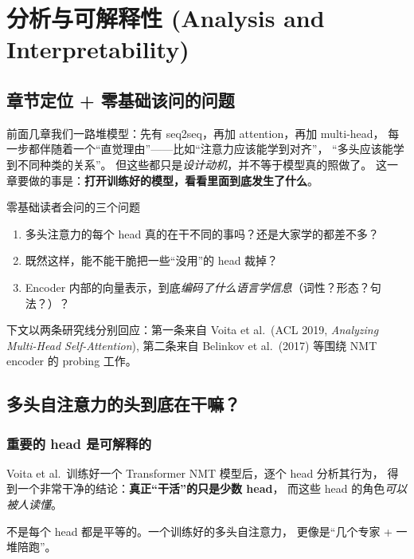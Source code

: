 \section{分析与可解释性 (Analysis and Interpretability)}
\label{sec:analysis}

\subsection{章节定位 + 零基础该问的问题}

前面几章我们一路堆模型：先有 seq2seq，再加 attention，再加 multi-head，
每一步都伴随着一个“直觉理由”——比如“注意力应该能学到对齐”，
“多头应该能学到不同种类的关系”。
但这些都只是\emph{设计动机}，并不等于模型真的照做了。
这一章要做的事是：\textbf{打开训练好的模型，看看里面到底发生了什么}。

\begin{problemblock}{零基础读者会问的三个问题}
\begin{enumerate}
  \item 多头注意力的每个 head 真的在干不同的事吗？还是大家学的都差不多？
  \item 既然这样，能不能干脆把一些“没用”的 head 裁掉？
  \item Encoder 内部的向量表示，到底\emph{编码了什么语言学信息}（词性？形态？句法？）？
\end{enumerate}
\end{problemblock}

下文以两条研究线分别回应：第一条来自
Voita et al.\ (ACL 2019, \emph{Analyzing Multi-Head Self-Attention}),
第二条来自 Belinkov et al.\ (2017) 等围绕 NMT encoder 的 probing 工作。

\subsection{多头自注意力的头到底在干嘛？}
\label{sec:head-roles}

\subsubsection{重要的 head 是可解释的}

Voita et al.\ 训练好一个 Transformer NMT 模型后，逐个 head 分析其行为，
得到一个非常干净的结论：\textbf{真正“干活”的只是少数 head}，
而这些 head 的角色\emph{可以被人读懂}。

\begin{intuitionblock}
不是每个 head 都是平等的。一个训练好的多头自注意力，
更像是“几个专家 + 一堆陪跑”。
\end{intuitionblock}

